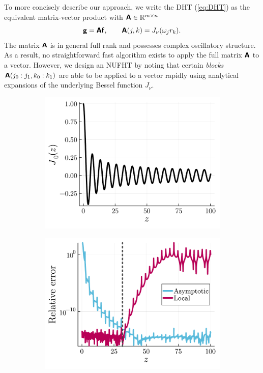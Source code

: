 
To more concisely describe our approach, we write the DHT (\ref{eq:DHT}) as the
equivalent matrix-vector product with $\bm{\mathsf{A}} \in \mathbb{R}^{m \times n}$
\begin{equation}
    \bm{\mathsf{g}} = \bm{\mathsf{A}}\bm{\mathsf{f}}, \qquad \bm{\mathsf{A}}(j,k) = J_\nu(\omega_j r_k).
\end{equation}
The matrix $\bm{\mathsf{A}}$ is in general full rank and possesses complex oscillatory
structure. As a result, no straightforward fast algorithm exists to apply the
full matrix $\bm{\mathsf{A}}$ to a vector. However, we design an NUFHT by noting that
certain \textit{blocks} $\bm{\mathsf{A}}(j_0:j_1, k_0:k_1)$ are able to be applied to a
vector rapidly using analytical expansions of the underlying Bessel function
$J_\nu$. 

\begin{figure}[!t]
  \centering
  \begin{subfigure}[b]{0.45\textwidth}
    \includegraphics[width=\textwidth]{./figures/bessel_function.pdf}
  \end{subfigure}
  \begin{subfigure}[b]{0.45\textwidth}
    \includegraphics[width=\textwidth]{./figures/pointwise_errors.pdf}

\end{subfigure}
\end{figure}
